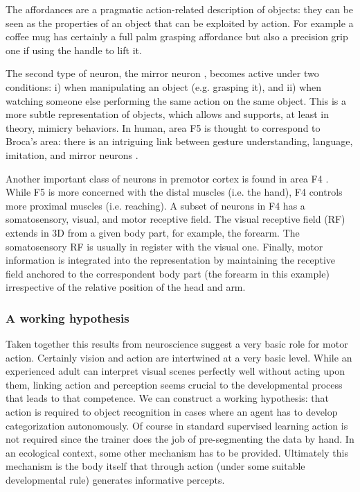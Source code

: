 \ifverbose
%
The affordances are a pragmatic action-related description of objects:
they can be seen as the properties of an object that can be exploited
by action.  For example a coffee mug has certainly a full palm
grasping affordance but also a precision grip one if using the handle
to lift it.
%
\fi

The second type of neuron, the mirror neuron
\cite{fadiga00visuomotor}, becomes active under two conditions: i)
when manipulating an object (e.g.  grasping it), and ii) when watching
someone else performing the same action on the same object. This is a
more subtle representation of objects, which allows and supports, at
least in theory, mimicry behaviors. In human, area F5 is thought to
correspond to Broca's area: there is an intriguing link between
gesture understanding, language, imitation, and mirror neurons
\cite{rizzolatti98language}.

Another important class of neurons in premotor cortex is found in area
F4 \cite{fogassi96coding}. While F5 is more concerned with the distal
muscles (i.e. the hand), F4 controls more proximal muscles (i.e.
reaching). A subset of neurons in F4 has a somatosensory, visual, and
motor receptive field. The visual receptive field (RF) extends in 3D
from a given body part, for example, the forearm. The somatosensory RF
is usually in register with the visual one. Finally, motor information
is integrated into the representation by maintaining the receptive
field anchored to the correspondent body part (the forearm in this
example) irrespective of the relative position of the head and arm.

\subsubsection*{A working hypothesis}


Taken together this results from neuroscience suggest a very basic role
for motor action. 
Certainly vision and action are
intertwined at a very basic level.  While an
experienced adult can interpret visual scenes perfectly well without
acting upon them, linking action and perception seems crucial to the
developmental process that leads to that competence.  We can construct
a working hypothesis: that action is required to object recognition in
cases where an agent has to develop categorization autonomously.  Of
course in standard supervised learning action is not required since
the trainer does the job of pre-segmenting the data by hand.  In an
ecological context, some other mechanism has to be provided.
Ultimately this mechanism is the body itself that through action
(under some suitable developmental rule) generates informative
percepts.

